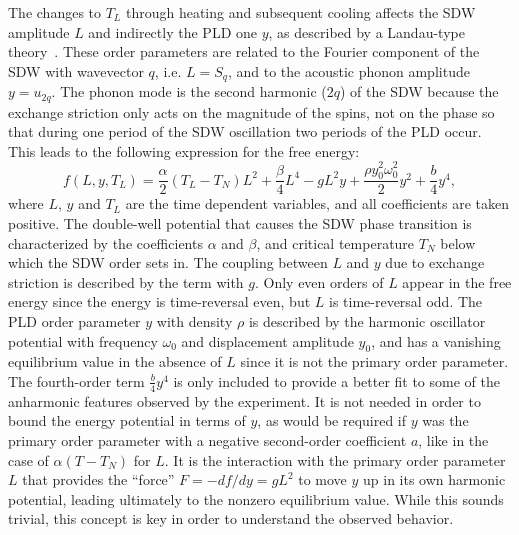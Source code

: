 The changes to $T_L$ through heating and subsequent cooling affects the \gls{SDW} amplitude $L$ and indirectly the \gls{PLD} one $y$, as described by a Landau-type theory~\cite{Khomskii2010}.
These order parameters are related to the Fourier component of the \gls{SDW} with wavevector $q$, i.e. $L = S_q$, and to the acoustic phonon amplitude $y = u_{2q}$.
The phonon mode is the second harmonic ($2q$) of the \gls{SDW} because the exchange striction only acts on the magnitude of the spins, not on the phase so that during one period of the \gls{SDW} oscillation two periods of the \gls{PLD} occur.
This leads to the following expression for the free energy:
\begin{equation}
	\label{eq:Cr_landau}
	f(L, y, T_L) = \frac{\alpha}{2}(T_L - T_N) L^2 + \frac{\beta}{4} L^4 - g L^2 y + \frac{\rho y_0^2 \omega_0^2}{2} y^2 + \frac{b}{4} y^4,
\end{equation}
where $L$, $y$ and $T_L$ are the time dependent variables, and all coefficients are taken positive.
The double-well potential that causes the \gls{SDW} phase transition is characterized by the coefficients $\alpha$ and $\beta$,  and critical temperature $T_N$ below which the \gls{SDW} order sets in.
The coupling between $L$ and $y$ due to exchange striction is described by the term with $g$.
Only even orders of $L$ appear in the free energy since the energy is time-reversal even, but $L$ is time-reversal odd.
The \gls{PLD} order parameter $y$ with density $\rho$ is described by the harmonic oscillator potential with frequency $\omega_0$ and displacement amplitude $y_0$, and has a vanishing equilibrium value in the absence of $L$ since it is not the primary order parameter.
The fourth-order term $\frac{b}{4}y^4$ is only included to provide a better fit to some of the anharmonic features observed by the experiment.
It is not needed in order to bound the energy potential in terms of $y$, as would be required if $y$ was the primary order parameter with a negative second-order coefficient $a$, like in the case of $\alpha(T-T_N)$ for $L$.
It is the interaction with the primary order parameter $L$ that provides the ``force'' $F = -df/dy = gL^2$ to move $y$ up in its own harmonic potential, leading ultimately to the nonzero equilibrium value.
While this sounds trivial, this concept is key in order to understand the observed behavior.

